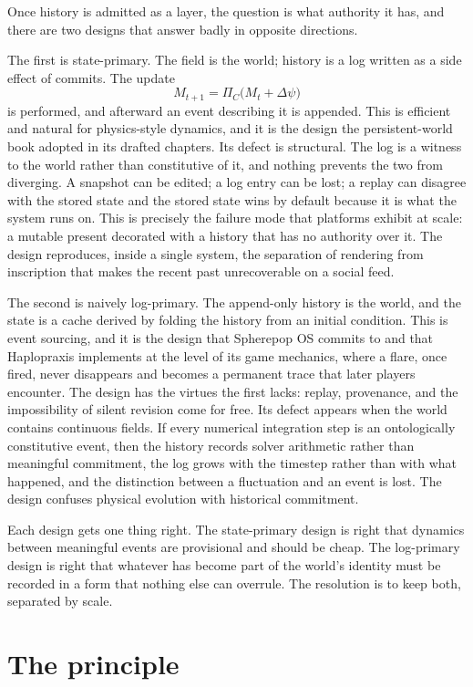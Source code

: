 \documentclass[11pt]{article}
\begin{document}
Once history is admitted as a layer, the question is what authority it has, and there are two designs that answer badly in opposite directions.

The first is state-primary. The field is the world; history is a log written as a side effect of commits. The update
\[
M_{t+1} = \Pi_C\bigl(M_t + \Delta\psi\bigr)
\]
is performed, and afterward an event describing it is appended. This is efficient and natural for physics-style dynamics, and it is the design the persistent-world book adopted in its drafted chapters. Its defect is structural. The log is a witness to the world rather than constitutive of it, and nothing prevents the two from diverging. A snapshot can be edited; a log entry can be lost; a replay can disagree with the stored state and the stored state wins by default because it is what the system runs on. This is precisely the failure mode that platforms exhibit at scale: a mutable present decorated with a history that has no authority over it. The design reproduces, inside a single system, the separation of rendering from inscription that makes the recent past unrecoverable on a social feed.

The second is naively log-primary. The append-only history is the world, and the state is a cache derived by folding the history from an initial condition. This is event sourcing, and it is the design that Spherepop OS commits to and that Haplopraxis implements at the level of its game mechanics, where a flare, once fired, never disappears and becomes a permanent trace that later players encounter. The design has the virtues the first lacks: replay, provenance, and the impossibility of silent revision come for free. Its defect appears when the world contains continuous fields. If every numerical integration step is an ontologically constitutive event, then the history records solver arithmetic rather than meaningful commitment, the log grows with the timestep rather than with what happened, and the distinction between a fluctuation and an event is lost. The design confuses physical evolution with historical commitment.

Each design gets one thing right. The state-primary design is right that dynamics between meaningful events are provisional and should be cheap. The log-primary design is right that whatever has become part of the world's identity must be recorded in a form that nothing else can overrule. The resolution is to keep both, separated by scale.

\section{The principle}
\end{document}

